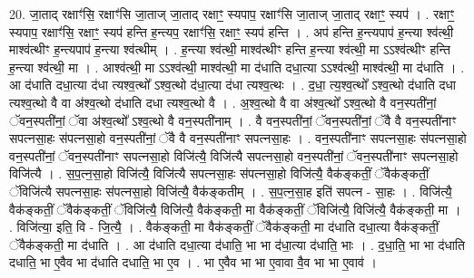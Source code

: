 \documentclass[17pt]{extarticle}
\begin{document}
20. जा॒ताद् रक्षाꣳ॑सि॒ रक्षाꣳ॑सि जा॒ताज् जा॒ताद् रक्षाꣳ॒॒ स्यपाप॒ रक्षाꣳ॑सि जा॒ताज् जा॒ताद् रक्षाꣳ॒॒ स्यप॑ । . रक्षाꣳ॒॒ स्यपाप॒ रक्षाꣳ॑सि॒ रक्षाꣳ॒॒ स्यप॑ हन्ति ह॒न्त्यप॒ रक्षाꣳ॑सि॒ रक्षाꣳ॒॒ स्यप॑ हन्ति । . अप॑ हन्ति ह॒न्त्यपाप॑ ह॒न्त्या श्व॑त्थी॒ माश्व॑त्थीꣳ ह॒न्त्यपाप॑ ह॒न्त्या श्व॑त्थीम् । . ह॒न्त्या श्व॑त्थी॒ माश्व॑त्थीꣳ हन्ति ह॒न्त्या श्व॑त्थी॒ मा ऽऽश्व॑त्थीꣳ हन्ति ह॒न्त्या श्व॑त्थी॒ मा । . आश्व॑त्थी॒ मा ऽऽश्व॑त्थी॒ माश्व॑त्थी॒ मा द॑धाति दधा॒त्या ऽऽश्व॑त्थी॒ माश्व॑त्थी॒ मा द॑धाति । . आ द॑धाति दधा॒त्या द॑धा त्यश्व॒त्थो᳚ ऽश्व॒त्थो द॑धा॒त्या द॑धा त्यश्व॒त्थः । . द॒धा॒ त्य॒श्व॒त्थो᳚ ऽश्व॒त्थो द॑धाति दधा त्यश्व॒त्थो वै वा अ॑श्व॒त्थो द॑धाति दधा त्यश्व॒त्थो वै । . अ॒श्व॒त्थो वै वा अ॑श्व॒त्थो᳚ ऽश्व॒त्थो वै वन॒स्पती॑नां॒ ॅवन॒स्पती॑नां॒ ॅवा अ॑श्व॒त्थो᳚ ऽश्व॒त्थो वै वन॒स्पती॑नाम् । . वै वन॒स्पती॑नां॒ ॅवन॒स्पती॑नां॒ ॅवै वै वन॒स्पती॑नाꣳ सपत्नसा॒हः स॑पत्नसा॒हो वन॒स्पती॑नां॒ ॅवै वै वन॒स्पती॑नाꣳ सपत्नसा॒हः । . वन॒स्पती॑नाꣳ सपत्नसा॒हः स॑पत्नसा॒हो वन॒स्पती॑नां॒ ॅवन॒स्पती॑नाꣳ सपत्नसा॒हो विजि॑त्यै॒ विजि॑त्यै सपत्नसा॒हो वन॒स्पती॑नां॒ ॅवन॒स्पती॑नाꣳ सपत्नसा॒हो विजि॑त्यै । . स॒प॒त्न॒सा॒हो विजि॑त्यै॒ विजि॑त्यै सपत्नसा॒हः स॑पत्नसा॒हो विजि॑त्यै॒ वैक॑ङ्कतीं॒ ॅवैक॑ङ्कतीं॒ ॅविजि॑त्यै सपत्नसा॒हः स॑पत्नसा॒हो विजि॑त्यै॒ वैक॑ङ्कतीम् । . स॒प॒त्न॒सा॒ह इति॑ सपत्न - सा॒हः । . विजि॑त्यै॒ वैक॑ङ्कतीं॒ ॅवैक॑ङ्कतीं॒ ॅविजि॑त्यै॒ विजि॑त्यै॒ वैक॑ङ्कती॒ मा वैक॑ङ्कतीं॒ ॅविजि॑त्यै॒ विजि॑त्यै॒ वैक॑ङ्कती॒ मा । . विजि॑त्या॒ इति॒ वि - जि॒त्यै॒ । . वैक॑ङ्कती॒ मा वैक॑ङ्कतीं॒ ॅवैक॑ङ्कती॒ मा द॑धाति दधा॒त्या वैक॑ङ्कतीं॒ ॅवैक॑ङ्कती॒ मा द॑धाति । . आ द॑धाति दधा॒त्या द॑धाति॒ भा भा द॑धा॒त्या द॑धाति॒ भाः । . द॒धा॒ति॒ भा भा द॑धाति दधाति॒ भा ए॒वैव भा द॑धाति दधाति॒ भा ए॒व । . भा ए॒वैव भा भा ए॒वावा वै॒व भा भा ए॒वाव॑ । \newline
\end{document}
